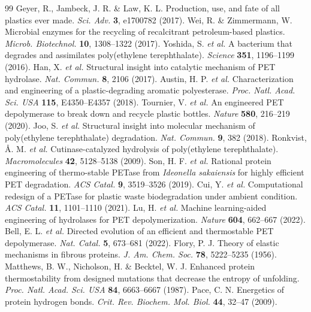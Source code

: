 \documentclass[journal=natcat,manuscript=article]{achemso}
\begin{document}
\begin{thebibliography}{99}
 Geyer, R., Jambeck, J. R. \& Law, K. L. Production, use, and fate of all plastics ever made. \textit{Sci. Adv.} \textbf{3}, e1700782 (2017).
 Wei, R. \& Zimmermann, W. Microbial enzymes for the recycling of recalcitrant petroleum-based plastics. \textit{Microb. Biotechnol.} \textbf{10}, 1308--1322 (2017).
 Yoshida, S. \textit{et al.} A bacterium that degrades and assimilates poly(ethylene terephthalate). \textit{Science} \textbf{351}, 1196--1199 (2016).
 Han, X. \textit{et al.} Structural insight into catalytic mechanism of PET hydrolase. \textit{Nat. Commun.} \textbf{8}, 2106 (2017).
 Austin, H. P. \textit{et al.} Characterization and engineering of a plastic-degrading aromatic polyesterase. \textit{Proc. Natl. Acad. Sci. USA} \textbf{115}, E4350--E4357 (2018).
 Tournier, V. \textit{et al.} An engineered PET depolymerase to break down and recycle plastic bottles. \textit{Nature} \textbf{580}, 216--219 (2020).
 Joo, S. \textit{et al.} Structural insight into molecular mechanism of poly(ethylene terephthalate) degradation. \textit{Nat. Commun.} \textbf{9}, 382 (2018).
 Ronkvist, \AA{}. M. \textit{et al.} Cutinase-catalyzed hydrolysis of poly(ethylene terephthalate). \textit{Macromolecules} \textbf{42}, 5128--5138 (2009).
 Son, H. F. \textit{et al.} Rational protein engineering of thermo-stable PETase from \textit{Ideonella sakaiensis} for highly efficient PET degradation. \textit{ACS Catal.} \textbf{9}, 3519--3526 (2019).
 Cui, Y. \textit{et al.} Computational redesign of a PETase for plastic waste biodegradation under ambient condition. \textit{ACS Catal.} \textbf{11}, 1101--1110 (2021).
 Lu, H. \textit{et al.} Machine learning-aided engineering of hydrolases for PET depolymerization. \textit{Nature} \textbf{604}, 662--667 (2022).
 Bell, E. L. \textit{et al.} Directed evolution of an efficient and thermostable PET depolymerase. \textit{Nat. Catal.} \textbf{5}, 673--681 (2022).
 Flory, P. J. Theory of elastic mechanisms in fibrous proteins. \textit{J. Am. Chem. Soc.} \textbf{78}, 5222--5235 (1956).
 Matthews, B. W., Nicholson, H. \& Becktel, W. J. Enhanced protein thermostability from designed mutations that decrease the entropy of unfolding. \textit{Proc. Natl. Acad. Sci. USA} \textbf{84}, 6663--6667 (1987).
 Pace, C. N. Energetics of protein hydrogen bonds. \textit{Crit. Rev. Biochem. Mol. Biol.} \textbf{44}, 32--47 (2009).
\end{thebibliography}
\end{document}
